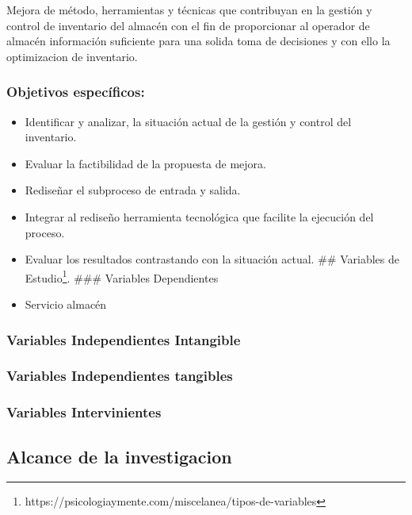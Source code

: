 \documentclass[11pt]{article}
\begin{document}
Mejora de método, herramientas y técnicas que contribuyan en la gestión
y control de inventario del almacén con el fin de proporcionar al
operador de almacén información suficiente para una solida toma de
decisiones y con ello la optimizacion de inventario.

\hypertarget{objetivos-especuxedficos}{%
\subsubsection{Objetivos específicos:}\label{objetivos-especuxedficos}}

\begin{itemize}
\item
  Identificar y analizar, la situación actual de la gestión y control
  del inventario.
\item
  Evaluar la factibilidad de la propuesta de mejora.
\item
  Rediseñar el subproceso de entrada y salida.
\item
  Integrar al rediseño herramienta tecnológica que facilite la ejecución
  del proceso.
\item
  Evaluar los resultados contrastando con la situación actual. \#\#
  Variables de Estudio\footnote{https://psicologiaymente.com/miscelanea/tipos-de-variables}.
  \#\#\# Variables Dependientes
\item
  Servicio almacén
\end{itemize}

\hypertarget{variables-independientes-intangible}{%
\subsubsection{Variables Independientes
Intangible}\label{variables-independientes-intangible}}

\hypertarget{variables-independientes-tangibles}{%
\subsubsection{Variables Independientes
tangibles}\label{variables-independientes-tangibles}}

\hypertarget{variables-intervinientes}{%
\subsubsection{Variables
Intervinientes}\label{variables-intervinientes}}

\hypertarget{alcance-de-la-investigacion}{%
\subsection{Alcance de la
investigacion}\label{alcance-de-la-investigacion}}
\end{document}
